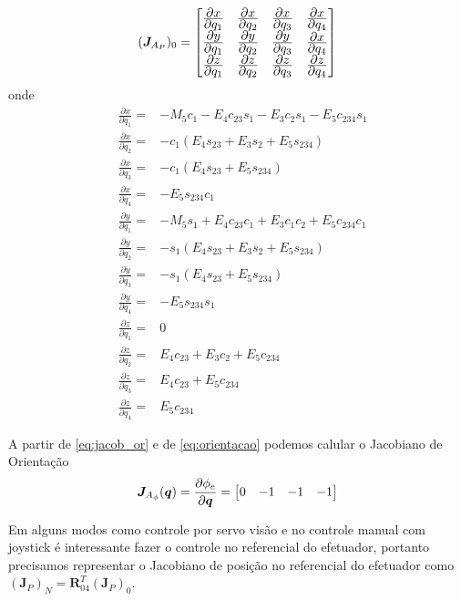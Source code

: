 \begin{equation}
(\bm{J}_{A_P})_0 = 
\begin{bmatrix}
	\frac{\displaystyle \partial x}{\displaystyle \partial q_1} & \frac{\displaystyle \partial x}{\displaystyle \partial q_2} & \frac{\displaystyle \partial x}{\displaystyle \partial q_3} & \frac{\displaystyle \partial x}{\displaystyle \partial q_4}  \\
	\frac{\displaystyle \partial y}{\displaystyle \partial q_1} & \frac{\displaystyle \partial y}{\displaystyle \partial q_2} & \frac{\displaystyle \partial y}{\displaystyle \partial q_3} & \frac{\displaystyle \partial x}{\displaystyle \partial q_4}  \\
	\frac{\displaystyle \partial z}{\displaystyle \partial q_1} & \frac{\displaystyle \partial z}{\displaystyle \partial q_2} & \frac{\displaystyle \partial z}{\displaystyle \partial q_3} & \frac{\displaystyle \partial z}{\displaystyle \partial q_4}  \\
\end{bmatrix}
\end{equation}
onde
\begin{align*}
&\frac{\partial x}{\partial q_1} =& - M_5c_1 - E_4c_{23}s_1 - E_3c_2s_1 - E_5c_{234}s_1  \\
&\frac{\partial x}{\partial q_2} =& -c_1(E_4s_{23}+E_3s_2+E_5s_{234}) \\
&\frac{\partial x}{\partial q_3} =& -c_1(E_4s_{23}+E_5s_{234}) \\
&\frac{\partial x}{\partial q_4} =& -E_5s_{234}c_1 \\
&\frac{\partial y}{\partial q_1} =& -M_5s_1+E_4c_{23}c_1+E_3c_1c_2+E_5c_{234}c_1 \\
&\frac{\partial y}{\partial q_2} =& -s_1(E_4s_{23}+E_3s_2+E_5s_{234}) \\
&\frac{\partial y}{\partial q_3} =& -s_1(E_4s_{23}+E_5s_{234}) \\
&\frac{\partial y}{\partial q_4} =& -E_5s_{234}s_1 \\ 
&\frac{\partial z}{\partial q_1} =& 0 \\ 
&\frac{\partial z}{\partial q_2} =& E_4c_{23}+E_3c_2+E_5c_{234} \\
&\frac{\partial z}{\partial q_3} =& E_4c_{23}+E_5c_{234}\\
&\frac{\partial z}{\partial q_4} =& E_{5}c_{234} 
\end{align*}

A partir de \ref{eq:jacob_or} e de \ref{eq:orientacao} podemos calular o Jacobiano de Orientação
\begin{equation}
\bm{J}_{A_\phi}(\bm{q}) = \frac{\partial \phi_e}{\partial \bm{q}} = \begin{bmatrix}0 & -1 & -1 & -1\end{bmatrix}
\end{equation}
 
Em alguns modos como controle por servo visão e no controle manual com joystick é interessante fazer o controle no referencial do efetuador, portanto precisamos representar o Jacobiano de posição no referencial do efetuador como $(\bm{J}_P)_N = \bm{R}_{04}^T (\bm{J}_P)_0$.  

